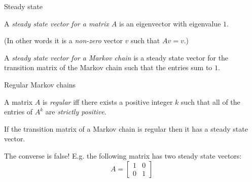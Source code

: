 \documentclass{beamer}
\begin{document}
\begin{frame}{Steady state}
	\begin{definition}
	A \emph{steady state vector for a matrix $A$} is an eigenvector with eigenvalue $1$.
	\end{definition}\vfill
 	(In other words it is a \emph{non-zero} vector $v$ such that $Av = v$.)\vfill
 	\begin{definition}
 	A \emph{steady state vector for a Markov chain} is a steady state vector for the transition matrix of the Markov chain such that the entries sum to $1$.
 	\end{definition}
\end{frame}

\begin{frame}{Regular Markov chains}
\begin{definition}
A matrix $A$ is \emph{regular} iff there exists a positive integer $k$ such that all of the entries of $A^k$ are \emph{strictly positive}.
\end{definition}
\begin{theorem}
If the transition matrix of a Markov chain is regular then it has a steady state vector.
\end{theorem}
\begin{example}
	The converse is false! E.g. the following matrix has two steady state vectors: 
	\begin{equation*}
	A = \left[
	\begin{matrix}
	1 & 0\\
	0 & 1
	\end{matrix}
	\right]
	\end{equation*}
\end{example}
\end{frame}
\end{document}
